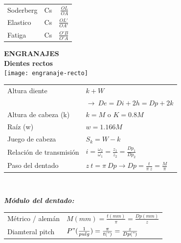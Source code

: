 \documentclass[11pt,a4paper]{article}
\begin{document}
\begin{multicols}{2}
\begin{cajita}
\vspace*{0.2cm}
\begin{tabular}{l c r}	
	Soderberg&Cs&$\frac{OL}{OA}$\\[0.2cm]
	Elastico&Cs&$\frac{OL'}{OA'}$\\[0.2cm]
	Fatiga&Cs&$\frac{O'B}{O'A}$\\[0.2cm]
\end{tabular}
	\end{cajita}
	\newpage
		\textbf{ENGRANAJES}\\
	\textbf{Dientes rectos}\\
			\texttt{[image: engranaje-recto]}\\
			\begin{tabular}{p{3.5cm} l}
				Altura diente & $k + W$\\
							&$\rightarrow~De=Di+2h=Dp+2k$\\
				Altura de cabeza (k) & $k= M$ o $K=0.8M$\\
				Raíz (w) & $w=1.166M$\\
				Juego de cabeza& $S_k=W-k$\\ \hline
				Relación de transmisión& $i=\frac{\omega_2}{\omega_1}=\frac{z_1}{z_2}=\frac{Dp_1}{Dp_2}$\\ 
				Paso del dentado &$z~t=\pi~Dp \rightarrow Dp=\frac{t}{\pi~z}=\frac{M}{\pi}$\\\hline
			\end{tabular}\\\vspace*{0.2cm}

			\textbf{\textit{Módulo del dentado:}}\\\vspace*{0.2cm}
			\begin{centering}
				\begin{tabular}{p{1.8cm} l}
					Métrico / alemán & $M(mm)=\frac{t(mm)}{\pi}=\frac{Dp(mm)}{z}$\\
					Diamteral pitch& $P"(\frac{1}{pulg})=\frac{\pi}{t(")}=\frac{z}{Dp(")}$\\
				\end{tabular}
			\end{centering}\\\vspace*{0.2cm}



\end{multicols}
\end{document}
